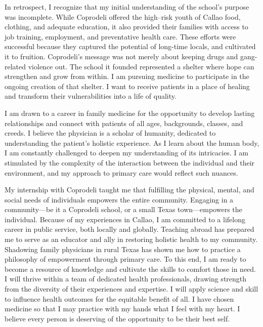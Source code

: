 \documentclass[12pt,a4paper,roman]{moderncv} %
\begin{document}
\medskip

In retrospect, I recognize that my initial understanding of the school's purpose was incomplete. While Coprodeli offered the high--risk youth of Callao food, clothing, and adequate education, it also provided their families with access to job training, employment, and preventative health care. These efforts were successful because they captured the potential of long-time locals, and cultivated it to fruition. Coprodeli's message was not merely about keeping drugs and gang-related violence out. The school it founded represented a shelter where hope can strengthen and grow from within. I am pursuing medicine to participate in the ongoing creation of that shelter. I want to receive patients in a place of healing and transform their vulnerabilities into a life of quality.

\medskip

I am drawn to a career in family medicine for the opportunity to develop lasting relationships and connect with patients of all ages, backgrounds, classes, and creeds. I believe the physician is a scholar of humanity, dedicated to understanding the patient's holistic experience. As I learn about the human body, I am constantly challenged to deepen my understanding of its intricacies. I am stimulated by the complexity of the interaction between the individual and their environment, and my approach to primary care would reflect such nuances. 

\medskip

My internship with Coprodeli taught me that fulfilling the physical, mental, and social needs of individuals empowers the entire community. Engaging in a community---be it a Coprodeli school, or a small Texas town---empowers the individual. Because of my experiences in Callao, I am committed to a lifelong career in public service, both locally and globally. Teaching abroad has prepared me to serve as an educator and ally in restoring holistic health to my community. Shadowing family physicians in rural Texas has shown me how to practice a philosophy of empowerment through primary care. To this end, I am ready to become a resource of knowledge and cultivate the skills to comfort those in need.  I will thrive within a team of dedicated health professionals, drawing strength from the diversity of their experiences and expertise. I will apply science and skill to influence health outcomes for the equitable benefit of all. I have chosen medicine so that I may practice with my hands what I feel with my heart. I believe every person is deserving of the opportunity to be their best self.
\end{document}
